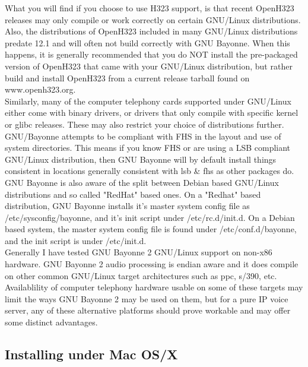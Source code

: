 \documentclass[a4paper,12pt]{article}
\begin{document}
What you will find if you choose to use H323 support, is that recent
OpenH323 releases may only compile or work correctly on certain
GNU/Linux distributions.  Also, the distributions of OpenH323 included
in many GNU/Linux distributions predate 12.1 and will often not build
correctly with GNU Bayonne.  When this happens, it is generally
recommended that you do NOT install the pre-packaged version of OpenH323
that came with your GNU/Linux distribution, but rather build and install
OpenH323 from a current release tarball found on www.openh323.org. \\

Similarly, many of the computer telephony cards supported under
GNU/Linux either come with binary drivers, or drivers that only compile
with specific kernel or glibc releases.  These may also restrict your
choice of distributions further. \\

GNU/Bayonne attempts to be compliant with FHS in the layout and use of
system directories.  This means if you know FHS or are using a LSB
compliant GNU/Linux distribution, then GNU Bayonne will by default
install things consistent in locations generally consistent with lsb \&
fhs as other packages do.  \\

GNU Bayonne is also aware of the split between Debian based GNU/Linux
distributions and so called "RedHat" based ones.   On a "Redhat" based
distribution, GNU Bayonne installs it's master system config file as
/etc/sysconfig/bayonne, and it's init script under /etc/rc.d/init.d.  On
a Debian based system, the master system config file is found under
/etc/conf.d/bayonne, and the init script is under /etc/init.d. \\

Generally I have tested GNU Bayonne 2 GNU/Linux support on non-x86
hardware.  GNU Bayonne 2 audio processing is endian aware and it does 
compile on other common GNU/Linux target architectures such as ppc,
s/390, etc. Availablility of computer telephony hardware usable on some
of these targets may limit the ways GNU Bayonne 2 may be used on them, but
for a pure IP voice server, any of these alternative platforms should prove
workable and may offer some distinct advantages. \\

\subsection{Installing under Mac OS/X}
\end{document}
